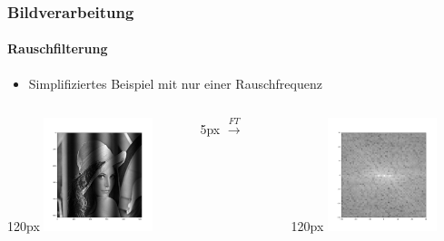 \begin{frame}
    \frametitle{Bildverarbeitung}
    \framesubtitle{Rauschfilterung}
    \begin{itemize}
        \item Simplifiziertes Beispiel mit nur einer Rauschfrequenz
    \end{itemize}
    \begin{columns}
        \begin{column}{120px}
            \includegraphics[width=120px]{images/04-applications-image-lena-cos.png} 
        \end{column}    
        \hspace*{-30px}
        \begin{column}{5px}
            $\overset{FT}{\longrightarrow}$
        \end{column}
        \hspace*{-30px}
        \begin{column}{120px}
            \includegraphics[width=120px]{images/04-applications-image-lena-cos-ft.png}
        \end{column}
    \end{columns}
\end{frame}

